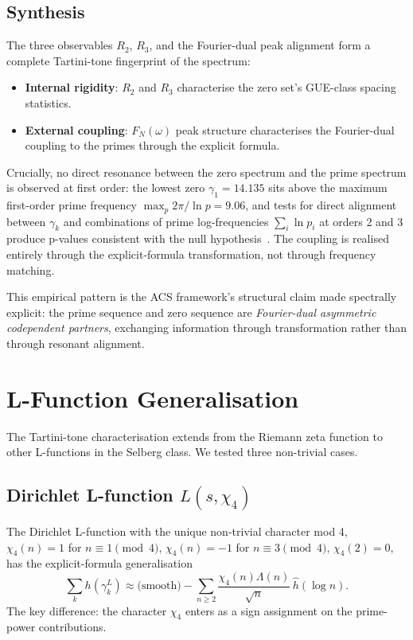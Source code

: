 \documentclass[11pt,a4paper]{article}
\theoremstyle{plain}
\theoremstyle{definition}
\theoremstyle{remark}
\begin{document}
\subsection{Synthesis}
\label{sec:tartini-synthesis}

The three observables $R_2$, $R_3$, and the Fourier-dual peak alignment
form a complete Tartini-tone fingerprint of the spectrum:

\begin{itemize}
\item \textbf{Internal rigidity}: $R_2$ and $R_3$ characterise the
zero set's GUE-class spacing statistics.
\item \textbf{External coupling}: $F_N(\omega)$ peak structure
characterises the Fourier-dual coupling to the primes through the
explicit formula.
\end{itemize}

Crucially, no direct resonance between the zero spectrum and the prime
spectrum is observed at first order: the lowest zero
$\gamma_1 = 14.135$ sits above the maximum first-order prime
frequency $\max_p 2\pi/\ln p = 9.06$, and tests for direct alignment
between $\gamma_k$ and combinations of prime log-frequencies
$\sum_i \ln p_i$ at orders 2 and 3 produce p-values consistent with
the null hypothesis~\cite{TartiniMap}. The coupling is realised
entirely through the explicit-formula transformation, not through
frequency matching.

This empirical pattern is the ACS framework's structural claim made
spectrally explicit: the prime sequence and zero sequence are
\emph{Fourier-dual asymmetric codependent partners}, exchanging
information through transformation rather than through resonant
alignment.


\section{L-Function Generalisation}
\label{sec:lfunctions}

The Tartini-tone characterisation extends from the Riemann zeta
function to other L-functions in the Selberg class. We tested three
non-trivial cases.

\subsection{Dirichlet L-function $L(s, \chi_4)$}
\label{sec:L-chi4}

The Dirichlet L-function with the unique non-trivial character mod 4,
$\chi_4(n) = 1$ for $n \equiv 1 \pmod{4}$, $\chi_4(n) = -1$ for
$n \equiv 3 \pmod{4}$, $\chi_4(2) = 0$, has the explicit-formula
generalisation
\begin{equation}
  \sum_k h(\gamma_k^L) \approx \text{(smooth)} - \sum_{n \geq 2}
  \frac{\chi_4(n) \Lambda(n)}{\sqrt{n}}\, \hat{h}(\log n).
  \label{eq:L-explicit}
\end{equation}
The key difference: the character $\chi_4$ enters as a sign
assignment on the prime-power contributions.
\end{document}
